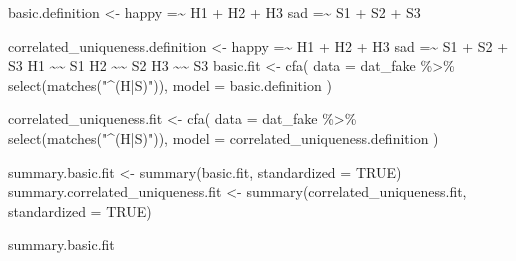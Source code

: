 \documentclass[
  letterpaper,
  DIV=11,
  numbers=noendperiod]{scrreprt}
\newenvironment{Shaded}{\begin{snugshade}}{\end{snugshade}}
\newcommand{\AttributeTok}[1]{\textcolor[rgb]{0.40,0.45,0.13}{#1}}
\newcommand{\ConstantTok}[1]{\textcolor[rgb]{0.56,0.35,0.01}{#1}}
\newcommand{\FunctionTok}[1]{\textcolor[rgb]{0.28,0.35,0.67}{#1}}
\newcommand{\NormalTok}[1]{\textcolor[rgb]{0.00,0.23,0.31}{#1}}
\newcommand{\OtherTok}[1]{\textcolor[rgb]{0.00,0.23,0.31}{#1}}
\newcommand{\SpecialCharTok}[1]{\textcolor[rgb]{0.37,0.37,0.37}{#1}}
\newcommand{\StringTok}[1]{\textcolor[rgb]{0.13,0.47,0.30}{#1}}
\begin{document}
\begin{Shaded}
\begin{Highlighting}[]
\NormalTok{basic.definition }\OtherTok{\textless{}{-}} 
  \StringTok{\textquotesingle{}happy =\textasciitilde{} H1 + H2 + H3}
\StringTok{   sad =\textasciitilde{} S1 + S2 + S3}
\StringTok{   \textquotesingle{}}

\NormalTok{correlated\_uniqueness.definition }\OtherTok{\textless{}{-}} 
  \StringTok{\textquotesingle{}happy =\textasciitilde{} H1 + H2 + H3}
\StringTok{   sad =\textasciitilde{} S1 + S2 + S3}
\StringTok{   }
\StringTok{   H1 \textasciitilde{}\textasciitilde{} S1}
\StringTok{   H2 \textasciitilde{}\textasciitilde{} S2}
\StringTok{   H3 \textasciitilde{}\textasciitilde{} S3}
\StringTok{   \textquotesingle{}}
\NormalTok{basic.fit }\OtherTok{\textless{}{-}} \FunctionTok{cfa}\NormalTok{(}
  \AttributeTok{data =}\NormalTok{ dat\_fake }\SpecialCharTok{\%\textgreater{}\%} \FunctionTok{select}\NormalTok{(}\FunctionTok{matches}\NormalTok{(}\StringTok{"\^{}(H|S)"}\NormalTok{)),}
  \AttributeTok{model =}\NormalTok{ basic.definition}
\NormalTok{)}

\NormalTok{correlated\_uniqueness.fit }\OtherTok{\textless{}{-}} \FunctionTok{cfa}\NormalTok{(}
  \AttributeTok{data =}\NormalTok{ dat\_fake }\SpecialCharTok{\%\textgreater{}\%} \FunctionTok{select}\NormalTok{(}\FunctionTok{matches}\NormalTok{(}\StringTok{"\^{}(H|S)"}\NormalTok{)),}
  \AttributeTok{model =}\NormalTok{ correlated\_uniqueness.definition}
\NormalTok{)}

\NormalTok{summary.basic.fit }\OtherTok{\textless{}{-}} \FunctionTok{summary}\NormalTok{(basic.fit, }\AttributeTok{standardized =} \ConstantTok{TRUE}\NormalTok{)}
\NormalTok{summary.correlated\_uniqueness.fit }\OtherTok{\textless{}{-}} \FunctionTok{summary}\NormalTok{(correlated\_uniqueness.fit, }\AttributeTok{standardized =} \ConstantTok{TRUE}\NormalTok{)}

\NormalTok{summary.basic.fit}
\end{Highlighting}
\end{Shaded}
\end{document}
